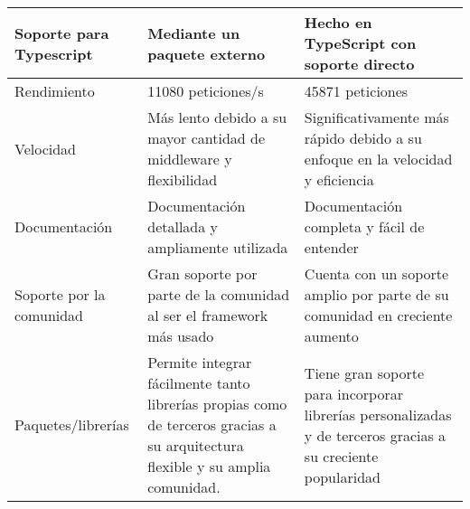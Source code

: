 \begin{longtable}{|p{3cm}|p{5cm}|p{5cm}|}
    \hline \hline
    \endlastfoot
    Soporte para Typescript                        & Mediante un paquete externo                                                                                                    & Hecho en TypeScript con soporte directo                                                                      \\\hline
    Rendimiento                                    & 11080 peticiones/s                                                                                                             & 45871 peticiones                                                                                             \\\hline
    Velocidad                                      & Más lento debido a su mayor cantidad de middleware y flexibilidad                                                              & Significativamente más rápido debido a su enfoque en la velocidad y eficiencia                               \\\hline
    Documentación                                  & Documentación detallada y ampliamente utilizada                                                                                & Documentación completa y fácil de entender                                                                   \\\hline
    Soporte por la comunidad                       & Gran soporte por parte de la comunidad al ser el framework más usado                                                           & Cuenta con un soporte amplio por parte de su comunidad en creciente aumento                                  \\\hline
    Paquetes/librerías                             & Permite integrar fácilmente tanto librerías propias como de terceros gracias a su arquitectura flexible y su amplia comunidad. & Tiene gran soporte para incorporar librerías personalizadas y de terceros gracias a su creciente popularidad \\
\end{longtable}